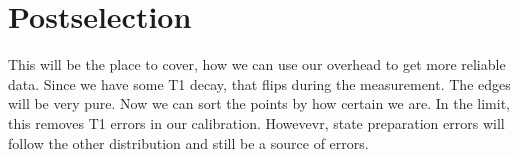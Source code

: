 \section{Postselection}
This will be the place to cover, how we can use our overhead to get more reliable data. Since we have some T1 decay, that flips during the measurement. The edges will be very pure. Now we can sort the points by how certain we are. In the limit, this removes T1 errors in our calibration. Howevevr, state preparation errors will follow the other distribution and still be a source of errors. 


